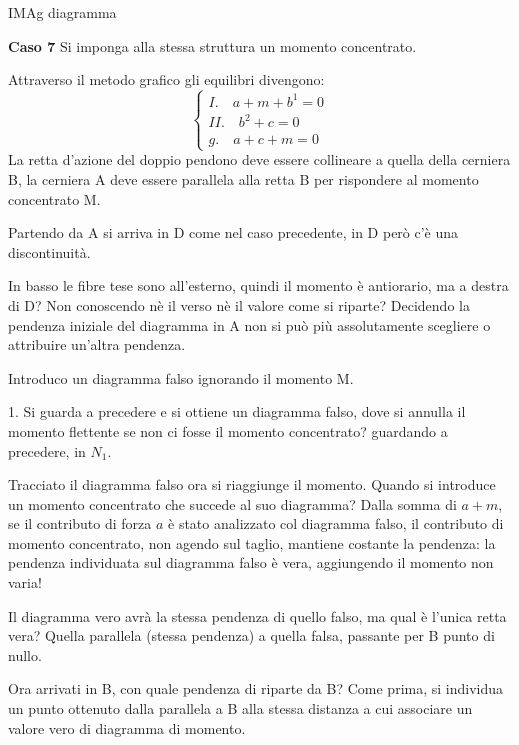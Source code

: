 \documentclass{article}
\begin{document}
\begin{adjustwidth}{2in}{}
	IMAg diagramma 
	
	\textbf{Caso 7}\newline 
	Si imponga alla stessa struttura un momento concentrato.\newline
	
		Attraverso il metodo grafico gli equilibri divengono: 
	\[\begin{cases}
		I.\quad a +m + b^1 = 0\\
		II.\quad b^2+c = 0 \\
		g.\quad a+c+m = 0
	\end{cases}\]
	La retta d'azione del doppio pendono deve essere collineare a quella della cerniera B, la cerniera A deve essere parallela alla retta B per rispondere al momento concentrato M. \newline 
	
	Partendo da A si arriva in D come nel caso precedente, in D però c'è una discontinuità. 
	
	In basso le fibre tese sono all'esterno, quindi il momento è antiorario, ma a destra di D? Non conoscendo nè il verso nè il valore come si riparte? Decidendo la pendenza iniziale del diagramma in A non si può più assolutamente scegliere o attribuire un'altra pendenza. \newline 
	
	Introduco un diagramma falso ignorando il momento M. 
	
	\item[1.] Si guarda a precedere e si ottiene un diagramma falso, dove si annulla il momento flettente se non ci fosse il momento concentrato? guardando a precedere, in $N_1$. 
	
	Tracciato il diagramma falso ora si riaggiunge il momento. Quando si introduce un momento concentrato che succede al suo diagramma? Dalla somma di $a+m$, se il contributo di forza $a$ è stato analizzato col diagramma falso, il contributo di momento concentrato, non agendo sul taglio, mantiene costante la pendenza: la pendenza individuata sul diagramma falso è vera, aggiungendo il momento non varia! \newline
	
	Il diagramma vero avrà la stessa pendenza di quello falso, ma qual è l'unica retta vera? Quella parallela (stessa pendenza) a quella falsa, passante per B punto di nullo. \newline 
	
	Ora arrivati in B, con quale pendenza di riparte da B? Come prima, si individua un punto ottenuto dalla parallela a B alla stessa distanza a cui associare un valore vero di diagramma di momento. \newpage
	

\end{adjustwidth}
\end{document}
